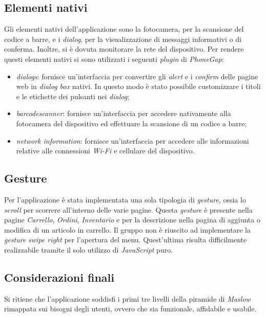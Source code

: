 \documentclass[12pt, a4paper, titlepage]{report}
\begin{document}
	\subsection{Elementi nativi}
	
	Gli elementi nativi dell'applicazione sono la fotocamera, per la scansione del codice a barre, e i \textit{dialog}, per la visualizzazione di messaggi informativi o di conferma. Inoltre, si è dovuta monitorare la rete del dispositivo. Per rendere questi elementi nativi si sono utilizzati i seguenti \textit{plugin} di \textit{PhoneGap}:
	\begin{itemize}
		\item \textit{dialogs}: fornisce un'interfaccia per convertire gli \textit{alert} e i \textit{confirm} delle pagine web in \textit{dialog box} nativi. In questo modo è stato possibile customizzare i titoli e le etichette dei pulsanti nei \textit{dialog};
		\item \textit{barcodescanner}: fornisce un'interfaccia per accedere nativamente alla fotocamera del dispositivo ed effettuare la scansione di un codice a barre;
		\item \textit{network information}: fornisce un'interfaccia per accedere alle informazioni relative alle connessioni \textit{Wi-Fi} e cellulare del dispositivo.
	\end{itemize}

	\subsection{Gesture}
	
	Per l'applicazione è stata implementata una sola tipologia di \textit{gesture}, ossia lo \textit{scroll} per scorrere all'interno delle varie pagine. Questa \textit{gesture} è presente nella pagine \textit{Carrello}, \textit{Ordini}, \textit{Inventario} e per la descrizione nella pagina di aggiunta o modifica di un articolo in carrello.
	Il gruppo non è riuscito ad implementare la \textit{gesture} \textit{swipe right} per l'apertura del menu. Quest'ultima risulta difficilmente realizzabile tramite il solo utilizzo di \textit{JavaScript} puro.
	
	\subsection{Considerazioni finali}
	
	Si ritiene che l'applicazione soddisfi i primi tre livelli della piramide di \textit{Maslow} rimappata sui bisogni degli utenti, ovvero che sia funzionale, affidabile e usabile.
	
\end{document}
